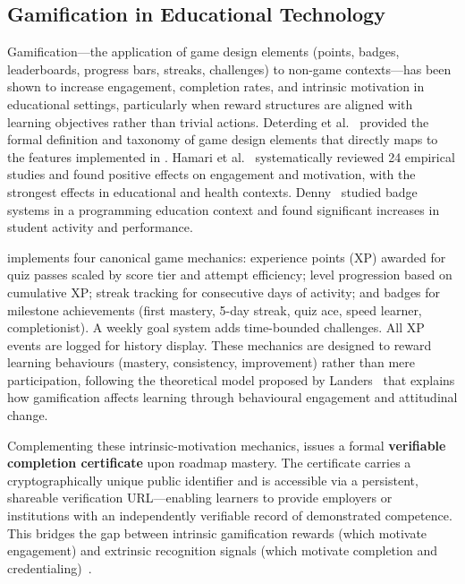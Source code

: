 \subsection{Gamification in Educational Technology}
\label{sec:gamification}

Gamification---the application of game design elements (points, badges, leaderboards, progress bars, streaks, challenges) to non-game contexts---has been shown to increase engagement, completion rates, and intrinsic motivation in educational settings, particularly when reward structures are aligned with learning objectives rather than trivial actions. Deterding et al.~\cite{deterding2011} provided the formal definition and taxonomy of game design elements that directly maps to the features implemented in \projectname. Hamari et al.~\cite{hamari2014} systematically reviewed 24 empirical studies and found positive effects on engagement and motivation, with the strongest effects in educational and health contexts. Denny~\cite{denny2013} studied badge systems in a programming education context and found significant increases in student activity and performance.

\projectname{} implements four canonical game mechanics: experience points (XP) awarded for quiz passes scaled by score tier and attempt efficiency; level progression based on cumulative XP; streak tracking for consecutive days of activity; and badges for milestone achievements (first mastery, 5-day streak, quiz ace, speed learner, completionist). A weekly goal system adds time-bounded challenges. All XP events are logged for history display. These mechanics are designed to reward learning behaviours (mastery, consistency, improvement) rather than mere participation, following the theoretical model proposed by Landers~\cite{landers2014} that explains how gamification affects learning through behavioural engagement and attitudinal change.

Complementing these intrinsic-motivation mechanics, \projectname{} issues a formal \textbf{verifiable completion certificate} upon roadmap mastery. The certificate carries a cryptographically unique public identifier and is accessible via a persistent, shareable verification URL---enabling learners to provide employers or institutions with an independently verifiable record of demonstrated competence. This bridges the gap between intrinsic gamification rewards (which motivate engagement) and extrinsic recognition signals (which motivate completion and credentialing)~\cite{deterding2011, hamari2014}.


